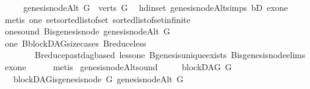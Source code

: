 \begin{isabellebody}
\ \ \isamarkupfalse%
\ \isamarkupfalse%
\ {\isachardoublequoteopen}genesis{\isacharunderscore}{\kern0pt}nodeAlt\ G\ {\isasymin}\ verts\ G{\isachardoublequoteclose}\ \isamarkupfalse%
\ hd{\isacharunderscore}{\kern0pt}in{\isacharunderscore}{\kern0pt}set\ genesis{\isacharunderscore}{\kern0pt}nodeAlt{\isachardot}{\kern0pt}simps\ bD\ exone\isanewline
\ \ \ \ \isamarkupfalse%
\ {\isacharparenleft}{\kern0pt}metis\ one\ set{\isacharunderscore}{\kern0pt}sorted{\isacharunderscore}{\kern0pt}list{\isacharunderscore}{\kern0pt}of{\isacharunderscore}{\kern0pt}set\ sorted{\isacharunderscore}{\kern0pt}list{\isacharunderscore}{\kern0pt}of{\isacharunderscore}{\kern0pt}set{\isachardot}{\kern0pt}infinite{\isacharparenright}{\kern0pt}\ \isanewline
\ \ \isamarkupfalse%
\ \isamarkupfalse%
\ one{\isacharunderscore}{\kern0pt}sound{\isacharcolon}{\kern0pt}\ {\isachardoublequoteopen}B{\isachardot}{\kern0pt}is{\isacharunderscore}{\kern0pt}genesis{\isacharunderscore}{\kern0pt}node\ {\isacharparenleft}{\kern0pt}genesis{\isacharunderscore}{\kern0pt}nodeAlt\ G{\isacharparenright}{\kern0pt}{\isachardoublequoteclose}\isanewline
\ \ \ \ \isamarkupfalse%
\ one\ B{\isachardot}{\kern0pt}blockDAG{\isacharunderscore}{\kern0pt}size{\isacharunderscore}{\kern0pt}cases\ B{\isachardot}{\kern0pt}reduce{\isacharunderscore}{\kern0pt}less\isanewline
\ \ \ \ \ \ \ \ B{\isachardot}{\kern0pt}reduce{\isacharunderscore}{\kern0pt}past{\isacharunderscore}{\kern0pt}dagbased\ less{\isacharunderscore}{\kern0pt}one\ B{\isachardot}{\kern0pt}genesis{\isacharunderscore}{\kern0pt}unique{\isacharunderscore}{\kern0pt}exists\ B{\isachardot}{\kern0pt}is{\isacharunderscore}{\kern0pt}genesis{\isacharunderscore}{\kern0pt}node{\isachardot}{\kern0pt}elims{\isacharparenleft}{\kern0pt}{}{\isacharparenright}{\kern0pt}\ exone\isanewline
\ \ \ \ \isamarkupfalse%
\ {\isacharparenleft}{\kern0pt}metis{\isacharparenright}{\kern0pt}\isanewline
{}\isamarkupfalse%
%
\endisatagproof
{\isafoldproof}%
%
\isadelimproof
\isanewline
%
\endisadelimproof
\isanewline
{}\isamarkupfalse%
\ genesis{\isacharunderscore}{\kern0pt}nodeAlt{\isacharunderscore}{\kern0pt}sound\ {\isacharcolon}{\kern0pt}\ \isanewline
\ \ \ {\isachardoublequoteopen}blockDAG\ G{\isachardoublequoteclose}\isanewline
\ \ \ {\isachardoublequoteopen}blockDAG{\isachardot}{\kern0pt}is{\isacharunderscore}{\kern0pt}genesis{\isacharunderscore}{\kern0pt}node\ G\ {\isacharparenleft}{\kern0pt}genesis{\isacharunderscore}{\kern0pt}nodeAlt\ G{\isacharparenright}{\kern0pt}{\isachardoublequoteclose}\ \isanewline

\end{isabellebody}
